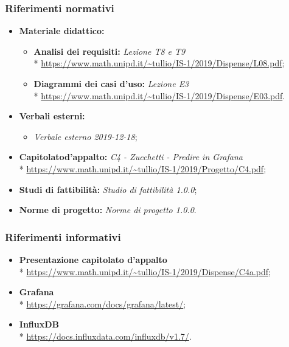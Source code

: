 		\subsubsection{Riferimenti normativi}
			\begin{itemize}
				\item \textbf{Materiale didattico:}
				\begin{itemize}
					\item \textbf{Analisi dei requisiti:} \textit{Lezione T8 e T9} \\*
						\url{https://www.math.unipd.it/~tullio/IS-1/2019/Dispense/L08.pdf};
					\item \textbf{Diagrammi dei casi d'uso:} \textit{Lezione E3} \\*
						\url{https://www.math.unipd.it/~tullio/IS-1/2019/Dispense/E03.pdf}.
				\end{itemize}
				\item \textbf{Verbali esterni:} 
				\begin{itemize}
					\item \textit{Verbale esterno 2019-12-18};
				\end{itemize}
				\item \textbf{Capitolato\glosp d'appalto:} \textit{C4 - Zucchetti - Predire in Grafana} \\*
						\url{https://www.math.unipd.it/~tullio/IS-1/2019/Progetto/C4.pdf};
					\item \textbf{Studi di fattibilità:} \textit{Studio di fattibilità 1.0.0};
					\item \textbf{Norme di progetto:} \textit{Norme di progetto 1.0.0}.
				\end{itemize}
		\subsubsection{Riferimenti informativi}
			\begin{itemize}
				\item \textbf{Presentazione capitolato d'appalto} \\*
					\url{https://www.math.unipd.it/~tullio/IS-1/2019/Dispense/C4a.pdf};
				\item \textbf{Grafana} \\*
					\url{https://grafana.com/docs/grafana/latest/};
				\item \textbf{InfluxDB} \\*
					\url{https://docs.influxdata.com/influxdb/v1.7/}.
			\end{itemize}
